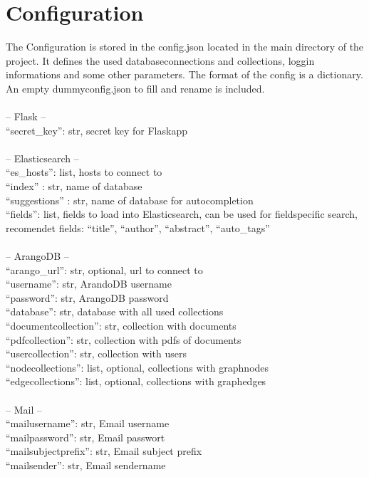 \section{Configuration}
The Configuration is stored in the config.json located in the main directory of the project. It defines the used databaseconnections and collections, loggin informations and some other parameters. The format of the config is a dictionary. An empty dummyconfig.json to fill and rename is included.\\
\\
-- Flask --\\
``secret\_key'': str, secret key for Flaskapp\\
 \\
-- Elasticsearch --\\
 ``es\_hosts'': list, hosts to connect to\\
 ``index'' : str, name of database\\
 ``suggestions'' : str, name of database for autocompletion\\
 ``fields'': list, fields to load into Elasticsearch, can be used for fieldspecific search, recomendet fields: ``title'', ``author'', ``abstract'', ``auto\_tags''\\
 \\
-- ArangoDB --\\
 ``arango\_url'': str, optional, url to connect to\\
 ``username'': str, ArandoDB username\\
 ``password'': str, ArangoDB password\\
 ``database'': str, database with all used collections\\
 ``documentcollection'': str, collection with documents\\
 ``pdfcollection'': str, collection with pdfs of documents\\
 ``usercollection'':  str, collection with users\\
 ``nodecollections'': list, optional, collections with graphnodes\\
 ``edgecollections'': list, optional, collections with graphedges\\
 \\
-- Mail --\\
 ``mailusername'': str, Email username\\
 ``mailpassword'': str, Email passwort\\
 ``mailsubjectprefix'': str, Email subject prefix\\
 ``mailsender'': str, Email sendername\\
